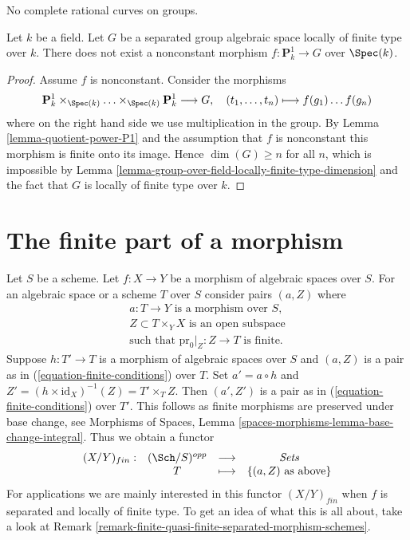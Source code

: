 \begin{lemma}
\label{lemma-no-nonconstant-morphism-from-P1-to-group}
\begin{slogan}
No complete rational curves on groups.
\end{slogan}
Let $k$ be a field. Let $G$ be a separated group algebraic space locally
of finite type over $k$. There does not exist a nonconstant
morphism $f : \mathbf{P}^1_k \to G$ over $\Spec(k)$.
\end{lemma}

\begin{proof}
Assume $f$ is nonconstant. Consider the morphisms
$$
\mathbf{P}^1_k \times_{\Spec(k)} \ldots \times_{\Spec(k)} \mathbf{P}^1_k
\longrightarrow G,
\quad (t_1, \ldots, t_n) \longmapsto f(g_1) \ldots f(g_n)
$$
where on the right hand side we use multiplication in the group.
By Lemma \ref{lemma-quotient-power-P1} and the assumption that $f$
is nonconstant this morphism is finite onto its image.
Hence $\dim(G) \geq n$ for all $n$, which is impossible by
Lemma \ref{lemma-group-over-field-locally-finite-type-dimension}
and the fact that $G$ is locally of finite type over $k$.
\end{proof}




\section{The finite part of a morphism}
\label{section-finite}

\noindent
Let $S$ be a scheme.
Let $f : X \to Y$ be a morphism of algebraic spaces over $S$.
For an algebraic space or a scheme $T$ over $S$ consider pairs
$(a, Z)$ where
\begin{equation}
\label{equation-finite-conditions}
\begin{matrix}
a : T \to Y\text{ is a morphism over }S, \\
Z \subset T \times_Y X\text{ is an open subspace} \\
\text{such that }\text{pr}_0|_Z : Z \to T\text{ is finite.}
\end{matrix}
\end{equation}
Suppose $h : T' \to T$ is a morphism of algebraic spaces over $S$
and $(a, Z)$ is a pair as in (\ref{equation-finite-conditions}) over $T$. Set
$a' = a \circ h$ and $Z' = (h \times \text{id}_X)^{-1}(Z) = T' \times_T Z$.
Then $(a', Z')$ is a pair as in (\ref{equation-finite-conditions}) over $T'$.
This follows as finite morphisms are preserved under base change, see
Morphisms of Spaces, Lemma \ref{spaces-morphisms-lemma-base-change-integral}.
Thus we obtain a functor
\begin{equation}
\label{equation-finite}
\begin{matrix}
(X/Y)_{fin} : &
(\Sch/S)^{opp} &
\longrightarrow &
\textit{Sets} \\
& T & \longmapsto &
\{(a, Z)\text{ as above}\}
\end{matrix}
\end{equation}
For applications we are mainly interested in this functor $(X/Y)_{fin}$
when $f$ is separated and locally of finite type. To get an idea
of what this is all about, take a look at
Remark \ref{remark-finite-quasi-finite-separated-morphism-schemes}.

